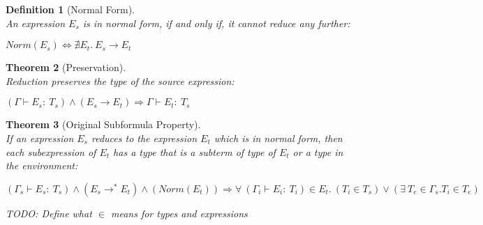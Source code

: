 \documentclass[11p,a4paper]{article}
\newcommand{\typecolor}{}
\newcommand{\termcolor}{}
\newcommand{\tp}[1]{{\typecolor #1}}
\newcommand{\tm}[1]{{\termcolor #1}}
\newtheorem{theorem}{Theorem}
\newtheorem{definition}[theorem]{Definition}
\newcommand{\env}{\tp{\Gamma}}
\newcommand{\typing}[2]{\tm{#1:\ }\tp{#2}}
\newcommand{\reduce}[2]{#1 \longrightarrow^* #2}
\begin{document}
\begin{definition}[Normal Form]\ \\
An expression $E_s$ is in normal form, if and only if, it cannot reduce any further:

$ Norm(E_s) \Leftrightarrow \nexists E_t.\ E_s \longrightarrow E_t$

\end{definition}

\begin{theorem}[Preservation]\ \\
Reduction preserves the type of the source expression:

$(\env \vdash \typing{E_s}{T_s})\wedge(E_s \longrightarrow E_t)\Rightarrow \env \vdash \typing{E_t}{T_s}$
\end{theorem}

\begin{theorem}[Original Subformula Property]\ \\
If an expression $E_s$ reduces to the expression $E_t$ which is in
normal form, then each subexpression of $E_t$ has a type that is a
subterm of type of $E_t$ or a type in the environment:

$$(\Gamma_s \vdash \typing{E_s}{T_s}) \wedge (\reduce{E_s}{E_t}) \wedge (Norm(E_t))
   \Rightarrow
   \forall\ (\Gamma_i \vdash \typing{E_i}{T_i}) \in E_t.\ (T_i \in T_s) 
            \vee 
            (\exists\ T_e \in \Gamma_s. T_i \in T_e)$$

TODO: Define what $\in$ means for types and expressions
\end{theorem}


 
\end{document}
